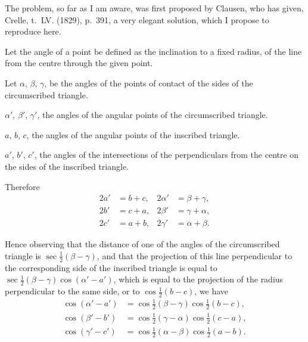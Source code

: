 \documentclass[11pt,a4paper]{article}
\theoremstyle{plain}
\begin{document}
The problem, so far as I am aware, was first proposed by Clausen, who has given, Crelle, t.~LV. (1829), p.~391, a very elegant solution, which I propose to reproduce here.

Let the angle of a point be defined as the inclination to a fixed radius, of the line from the centre through the given point.

Let $\alpha$, $\beta$, $\gamma$, be the angles of the points of contact of the sides of the circumscribed triangle.

$\alpha'$, $\beta'$, $\gamma'$, the angles of the angular points of the circumscribed triangle.

$a$, $b$, $c$, the angles of the angular points of the inscribed triangle.

$a'$, $b'$, $c'$, the angles of the intersections of the perpendiculars from the centre on the sides of the inscribed triangle.

Therefore
\begin{align*}
2a' &= b+c, & 2\alpha' &= \beta + \gamma,\\
2b' &= c+a, & 2\beta' &= \gamma + \alpha,\\
2c' &= a+b, & 2\gamma' &= \alpha + \beta.
\end{align*}

Hence observing that the distance of one of the angles of the circumscribed triangle is $\sec\tfrac{1}{2}(\beta - \gamma)$, and that the projection of this line perpendicular to the corresponding side of the inscribed triangle is equal to $\sec\tfrac{1}{2}(\beta - \gamma)\cos(\alpha' - a')$, which is equal to the projection of the radius perpendicular to the same side, or to $\cos\tfrac{1}{2}(b - c)$, we have
\begin{align*}
\cos(\alpha' - a') &= \cos\tfrac{1}{2}(\beta - \gamma)\cos\tfrac{1}{2}(b - c),\\
\cos(\beta' - b') &= \cos\tfrac{1}{2}(\gamma - \alpha)\cos\tfrac{1}{2}(c - a),\\
\cos(\gamma' - c') &= \cos\tfrac{1}{2}(\alpha - \beta)\cos\tfrac{1}{2}(a - b).
\end{align*}
\end{document}
